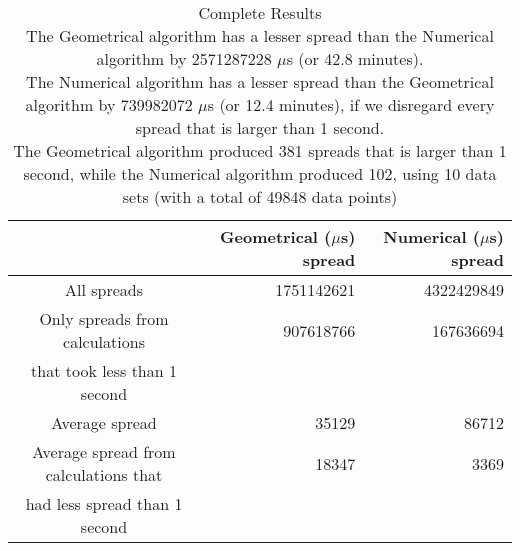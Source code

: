 \begin{table}[bth!]\footnotesize
 \begin{tabular}[3]{c|r|r}
 & Geometrical ($\mu$s) spread & Numerical ($\mu$s) spread\\
\hline
All spreads & 1751142621 & 4322429849 \\ 
\hline 
Only spreads from calculations & 907618766 & 167636694 \\ 
that took less than 1 second & & \\ 
\hline
Average spread & 35129 & 86712 \\
\hline
Average spread from calculations that & 18347 & 3369 \\ 
had less spread than 1 second & & \\ 
\end{tabular}\\ \\
\caption{Complete  Results\\
The Geometrical algorithm has a lesser spread than the Numerical algorithm by 2571287228 $\mu$s (or 42.8 minutes).\\
The Numerical algorithm has a lesser spread than the Geometrical algorithm by 739982072 $\mu$s (or 12.4 minutes), if we disregard every spread that is larger than 1 second.\\
The Geometrical algorithm produced 381 spreads that is larger than 1 second, while the Numerical algorithm produced 102, using 10 data sets (with a total of 49848 data points)\\
}\label{random_spreadtable}\end{table}